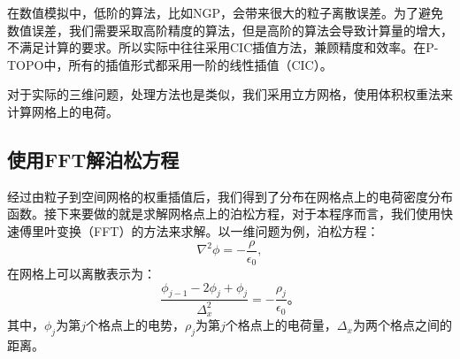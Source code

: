 {在数值模拟中，低阶的算法，比如NGP，会带来很大的粒子离散误差。为了避免数值误差，我们需要采取高阶精度的算法，但是高阶的算法会导致计算量的增大，不满足计算的要求。所以实际中往往采用CIC插值方法，兼顾精度和效率。在P-TOPO中，所有的插值形式都采用一阶的线性插值（CIC）。

对于实际的三维问题，处理方法也是类似，我们采用立方网格，使用体积权重法来计算网格上的电荷。

\subsection{使用FFT解泊松方程}
\label{section:PIC_FFT}
经过由粒子到空间网格的权重插值后，我们得到了分布在网格点上的电荷密度分布函数。接下来要做的就是求解网格点上的泊松方程，对于本程序而言，我们使用快速傅里叶变换（FFT）的方法来求解。以一维问题为例，泊松方程：
\begin{equation}\label{eq:Poisson}
\nabla^2 \phi = -\frac{\rho}{\epsilon _0},
\end{equation}
在网格上可以离散表示为：
\begin{equation}\label{eq:PoissonGrid}
\frac{\phi_{j-1}-2\phi_{j}+\phi_{j}}{\Delta _{x}^{2}}=-\frac{\rho _j}{\epsilon _0} \text{。}
\end{equation}
其中，$\phi_{j}$为第$j$个格点上的电势，$\rho_{j}$为第$j$个格点上的电荷量，$\Delta _{x}$为两个格点之间的距离。

}
